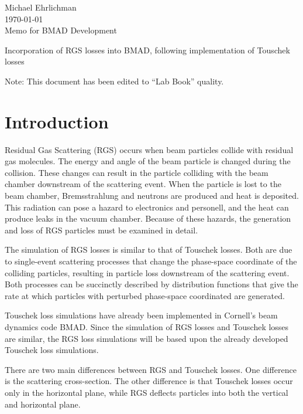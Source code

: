 \documentclass[a4paper,10pt]{article}
\begin{document}
\begin{flushright}
Michael Ehrlichman\\
\today\\
Memo for BMAD Development\\
\end{flushright}

\begin{center}
\Large
Incorporation of RGS losses into BMAD, following implementation of Touschek losses
\normalsize
\end{center}
\bigskip

Note:  This document has been edited to ``Lab Book'' quality.

\section{Introduction}

Residual Gas Scattering (RGS) occurs when beam particles collide with residual gas molecules.  The energy and angle of the beam particle is changed during the collision.  These changes can result in the particle colliding with the beam chamber downstream of the scattering event.  When the particle is lost to the beam chamber, Bremsstrahlung and neutrons are produced and heat is deposited.  This radiation can pose a hazard to electronics and personell, and the heat can produce leaks in the vacuum chamber.  Because of these hazards, the generation and loss of RGS particles must be examined in detail.

The simulation of RGS losses is similar to that of Touschek losses.  Both are due to single-event scattering processes that change the phase-space coordinate of the colliding particles, resulting in particle loss downstream of the scattering event.  Both processes can be succinctly described by distribution functions that give the rate at which particles with perturbed phase-space coordinated are generated.

Touschek loss simulations have already been implemented in Cornell's beam dynamics code BMAD.
Since the simulation of RGS losses and Touschek losses are similar, the RGS loss simulations will be based upon the 
already developed Touschek loss simulations.

There are two main differences between RGS and Touschek losses.  One difference is the scattering cross-section.  The other difference is that Touschek losses occur only in the horizontal plane, while RGS deflects particles into both the vertical and horizontal plane.
\end{document}
